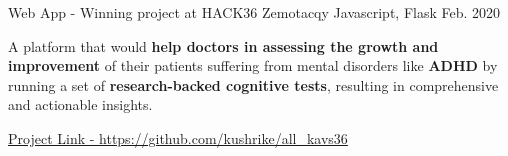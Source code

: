 \begin{cventries}
  \cventry
    {Web App - Winning project at HACK36} %
    {Zemotacqy} %
    {Javascript, Flask} %
    {Feb. 2020} %
    {
      \begin{cvitems} %
        \item {A platform that would \textbf{help doctors in assessing the growth and improvement} of their patients suffering from mental disorders like \textbf{ADHD} by running a set of \textbf{research-backed cognitive tests}, resulting in comprehensive and actionable insights.}
        \item {\href{https://github.com/kushrike/all_kavs36}{Project Link - https://github.com/kushrike/all\_kavs36}}
      \end{cvitems}
    }


    
\end{cventries}

